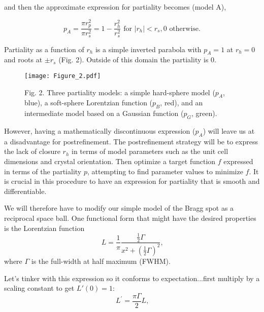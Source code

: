 \documentclass[12pt, letterpaper]{article}
\begin{document}
and then the approximate expression for partiality becomes (model A),

  \begin{equation}
    p_A = \frac{\pi r_p^2}{\pi r_s^2} = 1 - \frac{r_h^2}{r_s^2} \text{ for }|r_h|<r_s, 0 \text{ otherwise}
    \text{.}
    \label{eqn:fexprr}
  \end{equation}

Partiality as a function of $r_h$ is a simple inverted parabola with $p_A=1$ at $r_h=0$ and 
roots at $\pm r_s$ (Fig. 2).  Outside of this domain the partiality is 0. 

  \begin{figure}[htb!]
  \begin{center}
  \texttt{[image: Figure\_2.pdf]}
  \label{fig:2}
  \end{center}
  \begin{center}
  {Fig. 2. Three partiality models:  
  a simple hard-sphere model ($p_A$, blue), a soft-sphere Lorentzian
  function ($p_B$, red), and an intermediate model based on a Gaussian function
  ($p_G$, green).  }
  \end{center}
  \end{figure}

However, having a 
mathematically discontinuous
expression ($p_A$) will leave us at a disadvantage for postrefinement.  The postrefinement strategy  
will be to express the lack of closure $r_h$ in terms of model parameters such as the unit cell
dimensions and crystal orientation.  Then optimize a target function $f$ expressed in 
terms of the partiality $p$, attempting to find parameter values to minimize $f$.  It is 
crucial in this procedure to have an expression for partiality that is smooth and differentiable. 

We will therefore have to modify our simple model of the Bragg spot as a reciprocal space ball.  
One functional form that might have the desired properties is the Lorentzian function
  \begin{equation}
    L = \frac{1}{\pi}\frac{\frac{1}{2}\Gamma}{x^2 + (\frac{1}{2}\Gamma)^2}
    \text{,}
    \label{eqn:loren}
  \end{equation}
where $\Gamma$ is the full-width at half maximum (FWHM).  

Let's tinker with this expression so it conforms to expectation...first multiply by 
a scaling constant to get $L'(0)=1$:
  \begin{equation}
    L^{\prime} = \frac{\pi \Gamma}{2}L
    \text{,}
    \label{eqn:lorenA}
  \end{equation}
\end{document}
